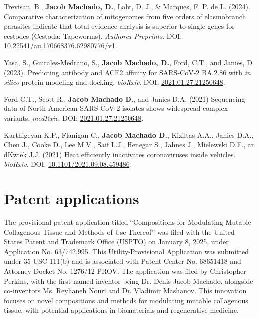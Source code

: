 \documentclass[11pt, letterpaper, sans]{moderncv}
\begin{document}
	{
		\setlength{\parskip}{.5em}\renewcommand{\baselinestretch}{2.0}
		\begin{hangparas}{.25in}{1}

        Trevisan, B., \textbf{Jacob Machado, D.}, Lahr, D. J., \& Marques, F. P. de L. (2024). Comparative characterization of mitogenomes from five orders of elasmobranch parasites indicate that total evidence analysis is superior to single genes for cestodes (Cestoda: Tapeworms). \textit{Authorea Preprints}. DOI: \href{https://doi.org/10.22541/au.170668376.62980776/v1}{10.22541/au.170668376.62980776/v1}.

		Yasa, S., Guirales-Medrano, S., \textbf{Jacob Machado, D.}, Ford, C.T., and Janies, D. (2023). Predicting antibody and ACE2 affinity for SARS-CoV-2 BA.2.86 with \textit{in silico} protein modeling and docking. \textit{bioRxiv}. DOI: \href{https://doi.org/10.1101/2023.11.22.568364}{2021.01.27.21250648}.

		Ford C.T., Scott R.,  \textbf{Jacob Machado D.}, and  Janies D.A. (2021) Sequencing data of North American SARS-CoV-2 isolates shows widespread complex variants. \textit{medRxiv}. DOI: \href{https://doi.org/10.1101/2021.01.27.21250648}{2021.01.27.21250648}.

		Karthigeyan K.P., Flanigan C., \textbf{Jacob Machado D.}, Kiziltas A.A., Janies D.A., Chen J., Cooke D., Lee M.V., Saif L.J., Henegar S., Jahnes J., Mielewski D.F., an dKwiek J.J. (2021) Heat efficiently inactivates coronaviruses inside vehicles. \textit{bioRxiv}. DOI: \href{https://doi.org/10.1101/2021.09.08.459486}{10.1101/2021.09.08.459486}.

		\end{hangparas}
	}


\section{Patent applications}

The provisional patent application titled ``Compositions for Modulating Mutable Collagenous Tissue and Methods of Use Thereof'' was filed with the United States Patent and Trademark Office (USPTO) on January 8, 2025, under Application No. 63/742,995. This Utility-Provisional Application was submitted under 35 USC 111(b) and is associated with Patent Center No. 68651418 and Attorney Docket No. 1276/12 PROV. The application was filed by Christopher Perkins, with the first-named inventor being Dr. Denis Jacob Machado, alongside co-inventors Ms. Reyhaneh Nouri and Dr. Vladimir Mashanov. This innovation focuses on novel compositions and methods for modulating mutable collagenous tissue, with potential applications in biomaterials and regenerative medicine.
\end{document}
